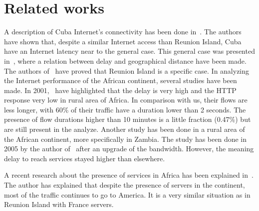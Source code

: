 \documentclass[10pt, conference, a4paper, twocolumns]{IEEEtran}
\def\rouge#1{\textcolor{red}{#1}}
\def\yassine#1{\textbf{\textcolor{blue}{yassine : #1}}}
\begin{document}

\section{Related works}
\label{sec:related}
A description of Cuba Internet's connectivity has been done in~\cite{Bischof2015}. The authors have shown that, despite a similar Internet access than Reunion Island, Cuba have an Internet latency near to the general case. This general case was presented in~\cite{Krajsa2011}, where a relation between delay and geographical distance have been made. The authors of~\cite{Noordally2016} have proved that Reunion Island is a specific case. In analyzing the Internet performance of the African continent, several studies have been made.
In 2001,~\cite{Johnson2011} have highlighted that the delay is very high and the HTTP response very low in rural area of Africa. In comparison with us, their flows are less longer, with 60\% of their traffic have a duration lower than 2 seconds.
The presence of flow durations higher than 10 minutes is a little fraction (0.47\%) but are still present in the analyze. 
Another study has been done in a rural area of the African continent, more specifically in Zambia. The study has been done in 2005 by the author of~\cite{zheleva2015internet} after an upgrade of the bandwidth. However, the meaning delay to reach services stayed higher than elsewhere.

A recent research about the presence of services in Africa has been explained in~\cite{fanou2016pushing}. The author has explained that despite the presence of servers in the continent, most of the traffic continues to go to America. It is a very similar situation as in Reunion Island with France servers.
\end{document}
